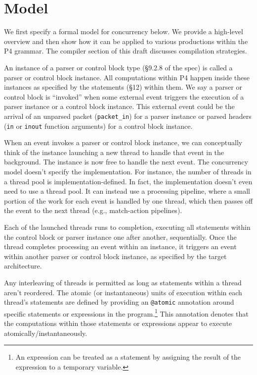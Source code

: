 \section{Model}

We first specify a formal model for concurrency below. We provide a high-level
overview and then show how it can be applied to various productions within the P4
grammar. The compiler section of this draft discusses compilation strategies.

An instance of a parser or control block type (\S9.2.8 of the spec) is called a
parser or control block instance.  All computations within P4 happen inside
these instances as specified by the statements (\S12) within them.  We say a
parser or control block is ``invoked'' when some external event triggers the
execution of a parser instance or a control block instance.  This external
event could be the arrival of an unparsed packet (\texttt{packet\_in}) for a
parser instance or parsed headers (\texttt{in} or \texttt{inout} function
arguments) for a control block instance.

When an event invokes a parser or control block instance, we can conceptually
think of the instance launching a new thread to handle that event in the
background.  The instance is now free to handle the next event. The concurrency
model doesn't specify the implementation. For instance, the number of threads
in a thread pool is implementation-defined.  In fact, the implementation
doesn't even need to use a thread pool. It can instead use a processing
pipeline, where a small portion of the work for each event is handled by one
thread, which then passes off the event to the next thread (e.g., match-action
pipelines).

Each of the launched threads runs to completion, executing all statements
within the control block or parser instance one after another, sequentially.
Once the thread completes processing an event within an instance, it triggers
an event within another parser or control block instance, as specified by the
target architecture.

Any interleaving of threads is permitted as long as statements within a thread
aren't reordered. The atomic (or instantaneous) units of execution within each
thread's statements are defined by providing an \texttt{@atomic} annotation
around specific statements or expressions in the program.\footnote{An
expression can be treated as a statement by assigning the result of the
expression to a temporary variable.} This annotation denotes that the
computations within those statements or expressions appear to execute
atomically/instantaneously.

